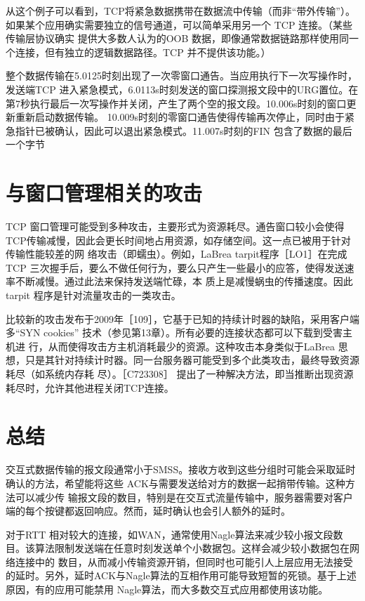 从这个例子可以看到，TCP将紧急数据携带在数据流中传输（而非“带外传输”）。如果某个应用确实需要独立的信号通道，可以简单采用另一个 TCP 连接。（某些传输层协议确实
提供大多数人认为的OOB 数据，即像通常数据链路那样使用同一个连接，但有独立的逻辑数据路径。TCP 并不提供该功能。）

整个数据传输在5.0125时刻出现了一次零窗口通告。当应用执行下一次写操作时，发送端TCP 进入紧急模式，6.0113s时刻发送的窗口探测报文段中的URG置位。在第7秒执行最后一次写操作并关闭，产生了两个空的报文段。10.006s时刻的窗口更新重新启动数据传输。
10.009s时刻的零窗口通告使得传输再次停止，同时由于紧急指针已被确认，因此可以退出紧急模式。11.007s时刻的FIN 包含了数据的最后一个字节

\section{与窗口管理相关的攻击}
TCP 窗口管理可能受到多种攻击，主要形式为资源耗尽。通告窗口较小会使得TCP传输减慢，因此会更长时间地占用资源，如存储空间。这一点已被用于针对传输性能较差的网
络攻击（即蠕虫）。例如，LaBrea tarpit程序［LO1］在完成 TCP 三次握手后，要么不做任何行为，要么只产生一些最小的应答，使得发送速率不断减慢。通过此法来保持发送端忙碌，本
质上是减慢蜗虫的传播速度。因此 tarpit 程序是针对流量攻击的一类攻击。

比较新的攻击发布于2009年［109］，它基于已知的持续计时器的缺陷，采用客户端多“SYN cookies” 技术（参见第13章）。所有必要的连接状态都可以下载到受害主机进
行，从而使得攻击方主机消耗最少的资源。这种攻击本身类似于LaBrea 思想，只是其针对持续计时器。同一台服务器可能受到多个此类攻击，最终导致资源耗尽（如系统内存耗
尽）。［C723308］ 提出了一种解决方法，即当推断出现资源耗尽时，允许其他进程关闭TCP连接。


\section{总结}

交互式数据传输的报文段通常小于SMSS。接收方收到这些分组时可能会采取延时确认的方法，希望能将这些 ACK与需要发送给对方的数据一起捎带传输。这种方法可以减少传
输报文段的数目，特别是在交互式流量传输中，服务器需要对客户端的每个按键都返回响应。然而，延时确认也会引人额外的延时。

对于RTT 相对较大的连接，如WAN，通常使用Nagle算法来减少较小报文段数目。该算法限制发送端在任意时刻发送单个小数据包。这样会减少较小数据包在网络连接中的
数目，从而减小传输资源开销，但同时也可能引人上层应用无法接受的延时。另外，延时ACK与Nagle算法的互相作用可能导致短暂的死锁。基于上述原因，有的应用可能禁用
Nagle算法，而大多数交互式应用都使用该功能。

